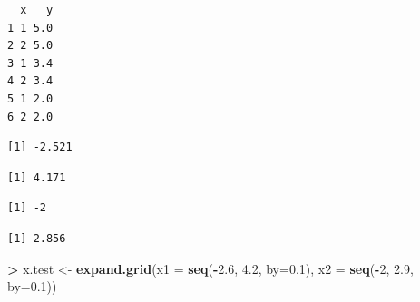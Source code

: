 \documentclass[
]{krantz}
\makeatletter
\newenvironment{Shaded}{\begin{snugshade}}{\end{snugshade}}
\newcommand{\DataTypeTok}[1]{\textcolor[rgb]{0.27,0.27,0.27}{#1}}
\newcommand{\DecValTok}[1]{\textcolor[rgb]{0.06,0.06,0.06}{#1}}
\newcommand{\FloatTok}[1]{\textcolor[rgb]{0.06,0.06,0.06}{#1}}
\newcommand{\KeywordTok}[1]{\textcolor[rgb]{0.27,0.27,0.27}{\textbf{#1}}}
\newcommand{\NormalTok}[1]{#1}
\newcommand{\OperatorTok}[1]{\textcolor[rgb]{0.43,0.43,0.43}{\textbf{#1}}}
\newcommand{\StringTok}[1]{\textcolor[rgb]{0.5,0.5,0.5}{#1}}
\newenvironment{kframe}{%
\medskip{}
\setlength{\fboxsep}{.8em}
 \def\at@end@of@kframe{}%
 \ifinner\ifhmode%
  \def\at@end@of@kframe{\end{minipage}}%
  \begin{minipage}{\columnwidth}%
 \fi\fi%
 \def\FrameCommand##1{\hskip\@totalleftmargin \hskip-\fboxsep
 \colorbox{shadecolor}{##1}\hskip-\fboxsep
     \hskip-\linewidth \hskip-\@totalleftmargin \hskip\columnwidth}%
 \MakeFramed {\advance\hsize-\width
   \@totalleftmargin\z@ \linewidth\hsize
   \@setminipage}}%
 {\par\unskip\endMakeFramed%
 \at@end@of@kframe}
\renewenvironment{Shaded}{\begin{kframe}}{\end{kframe}}
\makeatother
\begin{document}
\begin{verbatim}
  x   y
1 1 5.0
2 2 5.0
3 1 3.4
4 2 3.4
5 1 2.0
6 2 2.0
\end{verbatim}

\begin{Shaded}
\end{Shaded}

\begin{verbatim}
[1] -2.521
\end{verbatim}

\begin{Shaded}
\end{Shaded}

\begin{verbatim}
[1] 4.171
\end{verbatim}

\begin{Shaded}
\end{Shaded}

\begin{verbatim}
[1] -2
\end{verbatim}

\begin{Shaded}
\end{Shaded}

\begin{verbatim}
[1] 2.856
\end{verbatim}

\begin{Shaded}
\begin{Highlighting}[]
\OperatorTok{\textgreater{}}\StringTok{ }\NormalTok{x.test \textless{}{-}}\StringTok{ }\KeywordTok{expand.grid}\NormalTok{(}\DataTypeTok{x1 =} \KeywordTok{seq}\NormalTok{(}\OperatorTok{{-}}\FloatTok{2.6}\NormalTok{, }\FloatTok{4.2}\NormalTok{, }\DataTypeTok{by=}\FloatTok{0.1}\NormalTok{), }\DataTypeTok{x2 =} \KeywordTok{seq}\NormalTok{(}\OperatorTok{{-}}\DecValTok{2}\NormalTok{, }\FloatTok{2.9}\NormalTok{, }\DataTypeTok{by=}\FloatTok{0.1}\NormalTok{))}
\end{Highlighting}
\end{Shaded}
\end{document}
